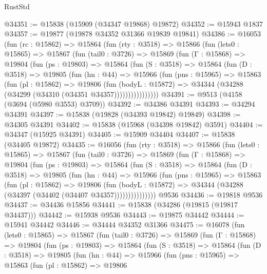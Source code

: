 \begin{lexlean}{RustStd}
\begin{coremodule}
@34351 := @15838 (@15909 (@34347 @19868) @19872)
@34352 := @15943 @1837
@34357 := @19877 (@19878 @34352 @31366 @19839 @19841)
@34386 := @16053
    (fun (rc : @15862) =>
    @15864
      (fun (rty : @3518) =>
      @15866
        (fun (lets0 : @15865) =>
        @15867
          (fun (tail0 : @3726) =>
          @15869
            (fun (Γ : @15868) =>
            @19804
              (fun (ps : @19803) =>
              @15864
                (fun (S : @3518) =>
                @15864
                  (fun (D : @3518) =>
                  @19805
                    (fun (hn : @44) =>
                    @15966
                      (fun (pns : @15965) =>
                      @15863
                        (fun (pl : @15862) =>
                        @19806
                          (fun (bodyL : @15872) =>
                          @34344 (@34288 (@34299 (@34310 (@34351 @34357))))))))))))))))
@34391 := @9513 (@4158 (@3694 (@5980 @3553) @3709))
@34392 := @34386 @34391
@34393 := @34294 @34391
@34397 := @15838 (@19828 (@34393 @19842) @19849)
@34398 := @34305 @34391
@34402 := @15838 (@15968 (@34398 @19842) @3591)
@34404 := @34347 (@15925 @34391)
@34405 := @15909 @34404
@34407 := @15838 (@34405 @19872)
@34435 := @16056
    (fun (rty : @3518) =>
    @15866
      (fun (lets0 : @15865) =>
      @15867
        (fun (tail0 : @3726) =>
        @15869
          (fun (Γ : @15868) =>
          @19804
            (fun (ps : @19803) =>
            @15864
              (fun (S : @3518) =>
              @15864
                (fun (D : @3518) =>
                @19805
                  (fun (hn : @44) =>
                  @15966
                    (fun (pns : @15965) =>
                    @15863
                      (fun (pl : @15862) =>
                      @19806
                        (fun (bodyL : @15872) =>
                        @34344 (@34288 (@34397 (@34402 (@34407 @34357)))))))))))))))
    @9536
@34436 := @19818 @9536
@34437 := @34436 @15856
@34441 := @15838 (@34286 (@19815 (@19817 @34437)))
@34442 := @15938 @9536
@34443 := @19875 @34442
@34444 := @15941 @34442
@34446 := @34444 @34352 @31366
@34475 := @16078
    (fun (lets0 : @15865) =>
    @15867
      (fun (tail0 : @3726) =>
      @15869
        (fun (Γ : @15868) =>
        @19804
          (fun (ps : @19803) =>
          @15864
            (fun (S : @3518) =>
            @15864
              (fun (D : @3518) =>
              @19805
                (fun (hn : @44) =>
                @15966
                  (fun (pns : @15965) =>
                  @15863
                    (fun (pl : @15862) =>
                    @19806

\end{coremodule}
\end{lexlean}
